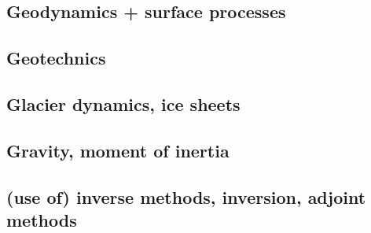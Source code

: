 \cite{kauf12}\cite{ngpc10}\cite{coks09}\cite{fewk17}\cite{kans08}\cite{geor11}
\cite{cogo09}\cite{cacp02}\cite{cacs05}\cite{coks05}\cite{coks02}\cite{coks00}
\cite{mofh08}\cite{iglo17}\cite{ngpe12}\cite{puth18}\cite{hepb17}\cite{ngpc11}
\cite{conp10}\cite{mofp10}\cite{lelk15} 

\subsection*{Geodynamics + surface processes}

\cite{howa94}
\cite{deea98}
\cite{avbu96}
\cite{will99a}
\cite{zemk01}\cite{tulg01}
\cite{wibr02}
\cite{lave05}\cite{will05}
\cite{rosw06}
\cite{alle08}\cite{rowf08}
\cite{whip09}
\cite{will10}\cite{tuha10}
\cite{robr11}
\cite{vehc13}

\subsection*{Geotechnics}

\cite{zhll03}

\subsection*{Glacier dynamics, ice sheets}

\cite{asbl06}
\cite{zhjg11}
\cite{lejx14}
\cite{issg15}

\subsection*{Gravity, moment of inertia}

\cite{rola77}
\cite{zhou08}


\subsection*{(use of) inverse methods, inversion, adjoint methods}

\cite{buht03}
\cite{wama09}
\cite{wosp14}\cite{hobo14}
\cite{wahg15}
\cite{ghbu16}
\cite{ligs17}

